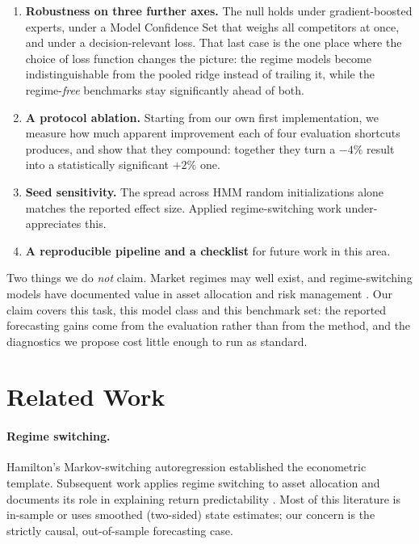 \documentclass[sigconf,nonacm]{acmart}
\begin{document}
\begin{enumerate}
  \item \textbf{Robustness on three further axes.} The null holds under
    gradient-boosted experts, under a Model Confidence Set that weighs all
    competitors at once, and under a decision-relevant loss. That last case is the
    one place where the choice of loss function changes the picture: the regime
    models become indistinguishable from the pooled ridge instead of trailing it,
    while the regime-\emph{free} benchmarks stay significantly ahead of both.

  \item \textbf{A protocol ablation.} Starting from our own first implementation,
    we measure how much apparent improvement each of four evaluation shortcuts
    produces, and show that they compound: together they turn a $-4\%$ result into
    a statistically significant $+2\%$ one.

  \item \textbf{Seed sensitivity.} The spread across HMM random initializations
    alone matches the reported effect size. Applied regime-switching work
    under-appreciates this.

  \item \textbf{A reproducible pipeline and a checklist} for future work in this
    area.
\end{enumerate}

Two things we do \emph{not} claim. Market regimes may well exist, and
regime-switching models have documented value in asset allocation and risk
management \cite{guidolin2007}. Our claim covers this task, this model class and
this benchmark set: the reported forecasting gains come from the evaluation
rather than from the method, and the diagnostics we propose cost little enough to
run as standard.

\section{Related Work}

\paragraph{Regime switching.}
Hamilton's Markov-switching autoregression \cite{hamilton1989} established the
econometric template. Subsequent work applies regime switching to asset
allocation \cite{guidolin2007} and documents its role in explaining return
predictability \cite{ang2012regime, timmermann2000}. Most of this literature is
in-sample or uses smoothed (two-sided) state estimates; our concern is the
strictly causal, out-of-sample forecasting case.
\end{document}
